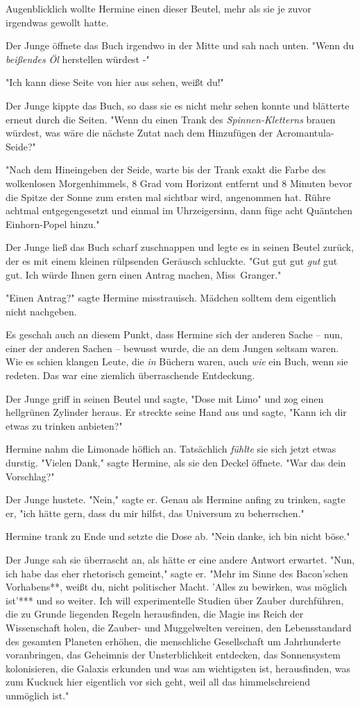 {Augenblicklich wollte Hermine einen dieser Beutel, mehr als sie je zuvor irgendwas gewollt hatte.

Der Junge öffnete das Buch irgendwo in der Mitte und sah nach unten. "Wenn du \emph{beißendes Öl} herstellen würdest -"

"Ich kann diese Seite von hier aus sehen, weißt du!"

Der Junge kippte das Buch, so dass sie es nicht mehr sehen konnte und blätterte erneut durch die Seiten. "Wenn du einen Trank des \emph{Spinnen-Kletterns} brauen würdest, was wäre die nächste Zutat nach dem Hinzufügen der Acromantula-Seide?"

"Nach dem Hineingeben der Seide, warte bis der Trank exakt die Farbe des wolkenlosen Morgenhimmels, 8 Grad vom Horizont entfernt und 8 Minuten bevor die Spitze der Sonne zum ersten mal sichtbar wird, angenommen hat. Rühre achtmal entgegengesetzt und einmal im Uhrzeigersinn, dann füge acht Quäntchen Einhorn-Popel hinzu."

Der Junge ließ das Buch scharf zuschnappen und legte es in seinen Beutel zurück, der es mit einem kleinen rülpsenden Geräusch schluckte. "Gut gut gut \emph{gut} gut gut. Ich würde Ihnen gern einen Antrag machen, Miss~Granger."

"Einen Antrag?" sagte Hermine misstrauisch. Mädchen solltem dem eigentlich nicht nachgeben.

Es geschah auch an diesem Punkt, dass Hermine sich der anderen Sache -- nun, einer der anderen Sachen -- bewusst wurde, die an dem Jungen seltsam waren. Wie es schien klangen Leute, die \emph{in} Büchern waren, auch \emph{wie} ein Buch, wenn sie redeten. Das war eine ziemlich überraschende Entdeckung.

Der Junge griff in seinen Beutel und sagte, "Dose mit Limo" und zog einen hellgrünen Zylinder heraus. Er streckte seine Hand aus und sagte, "Kann ich dir etwas zu trinken anbieten?"

Hermine nahm die Limonade höflich an. Tatsächlich \emph{fühlte} sie sich jetzt etwas durstig. "Vielen Dank," sagte Hermine, als sie den Deckel öffnete. "War das dein Vorschlag?"

Der Junge hustete. "Nein," sagte er. Genau als Hermine anfing zu trinken, sagte er, "ich hätte gern, dass du mir hilfst, das Universum zu beherrschen."

Hermine trank zu Ende und setzte die Dose ab. "Nein danke, ich bin nicht böse."

Der Junge sah sie überrascht an, als hätte er eine andere Antwort erwartet. "Nun, ich habe das eher rhetorisch gemeint," sagte er. "Mehr im Sinne des Bacon'schen Vorhabens**, weißt du, nicht politischer Macht. 'Alles zu bewirken, was möglich ist'*** und so weiter. Ich will experimentelle Studien über Zauber durchführen, die zu Grunde liegenden Regeln herausfinden, die Magie ins Reich der Wissenschaft holen, die Zauber- und Muggelwelten vereinen, den Lebensstandard des gesamten Planeten erhöhen, die menschliche Gesellschaft um Jahrhunderte voranbringen, das Geheimnis der Unsterblichkeit entdecken, das Sonnensystem kolonisieren, die Galaxis erkunden und was am wichtigsten ist, herausfinden, was zum Kuckuck hier eigentlich vor sich geht, weil all das himmelschreiend unmöglich ist."

}
